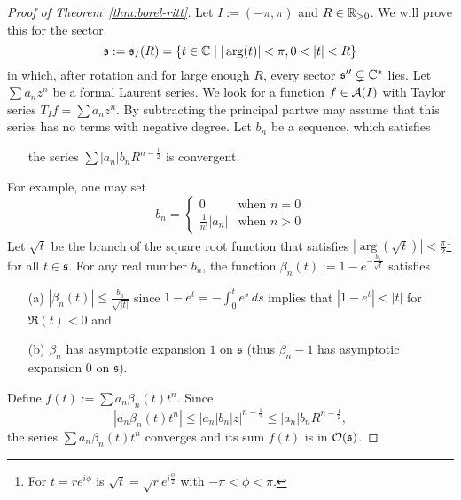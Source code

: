 \begin{proof}[Proof of Theorem~\ref{thm:borel-ritt}]
  Let $I:=(-\pi,\pi)$ and $R\in\mathbb{R}_{>0}$.
  We will prove this for the sector
  \[
    \mathfrak{s}:=\mathfrak{s}_{I}(R)=\left\{
      t\in\C\mid |\arg(t)|<\pi, 0<|t|<R
    \right\}
  \]
  in which, after rotation and for large enough $R$, every sector
  $\mathfrak{s}''\subsetneq\mathbb{C}^*$ lies.
  Let $\sum a_nz^n$ be a formal Laurent series. We look for a function
  $f\in\mathcal{A}(I)$ with Taylor series $T_{I}f=\sum a_nz^n$.
  By subtracting the principal part\TODO[?] we may assume that this series has
  no terms with negative degree.
  Let $b_n$ be a sequence, which satisfies
  \begin{itemize}
    \item[] the series $\sum |a_n|b_nR^{n-\frac{1}{2}}$ is convergent.
  \end{itemize}
  For example\TODO[realy?], one may set
  \[
    b_n=\begin{cases}
      0                 & \text{when~} n=0
      \\\frac{1}{n!}|a_n| & \text{when~} n>0
    \end{cases}
  \]
  Let $\sqrt{t}$ be the branch of the square root function that satisfies
  $|\arg(\sqrt{t})|<\frac{\pi}{2}$\footnote{For $t=re^{i\phi}$ is
  $\sqrt{t}=\sqrt{r}e^{i\frac{\phi}{2}}$ with $-\pi<\phi<\pi$.} for all
  $t\in\mathfrak{s}$.
  For any real number $b_n$, the function
  $\beta_n(t):=1-e^{-\frac{b_n}{\sqrt{t}}}$ satisfies
  \begin{enumerate}
    \item[(a)] $|\beta_n(t)|\leq\frac{b_n}{\sqrt{|t|}}$ since
      $1-e^t=-\int_0^te^s\,ds$ implies that $|1-e^t|<|t|$ for $\Re(t)<0$ and
    \item[(b)] $\beta_n$ has asymptotic expansion $1$ on $\mathfrak{s}$ (thus
      $\beta_n-1$ has asymptotic expansion $0$ on $\mathfrak{s}$).
  \end{enumerate}
  Define $f(t):=\sum a_n\beta_n(t)t^n$.
  Since
  \[
    |a_n\beta_n(t)t^n|
    \leq|a_n|b_n|z|^{n-\frac{1}{2}}
    \leq|a_n|b_nR^{n-\frac{1}{2}},
  \]
  the series
  $\sum a_n\beta_n(t)t^n$ converges and its sum $f(t)$ is in
  $\mathcal{O}(\mathfrak{s})$.


\end{proof}
